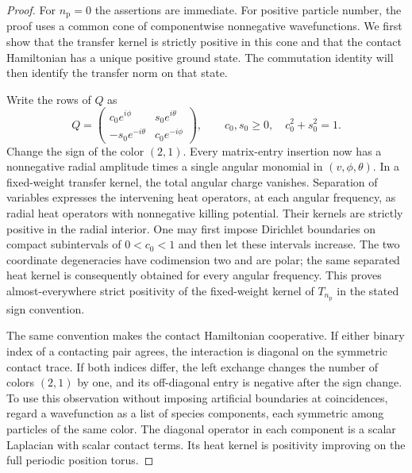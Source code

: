 \begin{proof}
For $n_{\mathrm p}=0$ the assertions are immediate.  For positive particle
number, the proof uses a common cone of componentwise nonnegative
wavefunctions.  We first show that the transfer kernel is strictly positive
in this cone and that the contact Hamiltonian has a unique positive ground
state.  The commutation identity will then identify the transfer norm on
that state.

Write the rows of $Q$ as
\[
 Q=\begin{pmatrix}
 c_0e^{i\phi}&s_0e^{i\theta}\\
 -s_0e^{-i\theta}&c_0e^{-i\phi}
 \end{pmatrix},
 \qquad c_0,s_0\ge0,\quad c_0^2+s_0^2=1.
\]
Change the sign of the color $(2,1)$.  Every matrix-entry insertion now
has a nonnegative radial amplitude times a single angular monomial in
$(v,\phi,\theta)$.  In a fixed-weight transfer kernel, the total angular
charge vanishes.  Separation of variables expresses the intervening heat
operators, at each angular frequency, as radial heat operators with
nonnegative killing potential.  Their kernels are strictly positive in
the radial interior.  One may first impose Dirichlet boundaries on compact
subintervals of $0<c_0<1$ and then let these intervals increase.  The two
coordinate degeneracies have codimension two and are polar; the same
separated heat kernel is consequently obtained for every angular
frequency.  This proves almost-everywhere strict positivity of the
fixed-weight kernel of $T_{n_{\mathrm p}}$ in the stated sign convention.

The same convention makes the contact Hamiltonian cooperative.  If either
binary index of a contacting pair agrees, the interaction is diagonal on
the symmetric contact trace.  If both indices differ, the left exchange
changes the number of colors $(2,1)$ by one, and its off-diagonal entry is
negative after the sign change.  To use this observation without imposing
artificial boundaries at coincidences, regard a wavefunction as a list
of species components, each symmetric among particles of the same color.
The diagonal operator in each component is a scalar Laplacian with scalar
contact terms.  Its heat kernel is positivity improving on the full
periodic position torus.


\end{proof}
